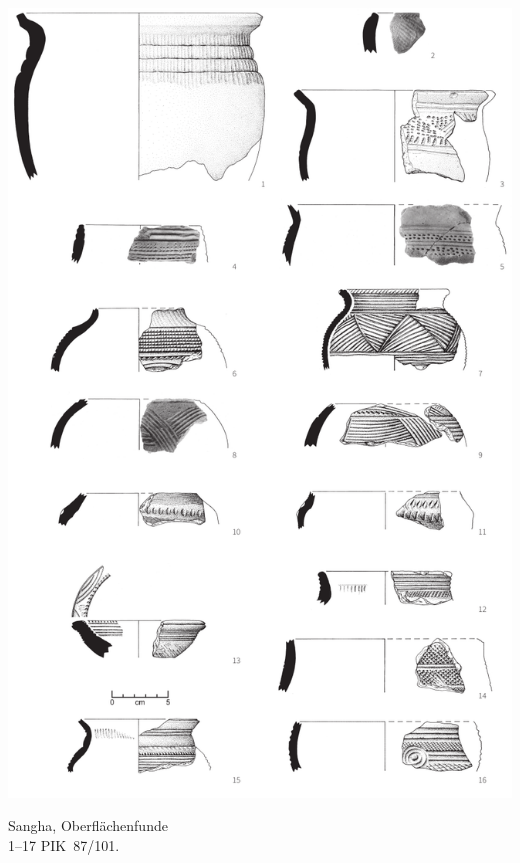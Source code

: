 \begin{pl}[H]
	\includegraphics{plt/Taf54.pdf}
	\vspace{.75em}\caption{\mbox{Sangha}, Oberflächenfunde \\ 1--17 PIK~87/101.}
	\label{pl:54}
\end{pl}

